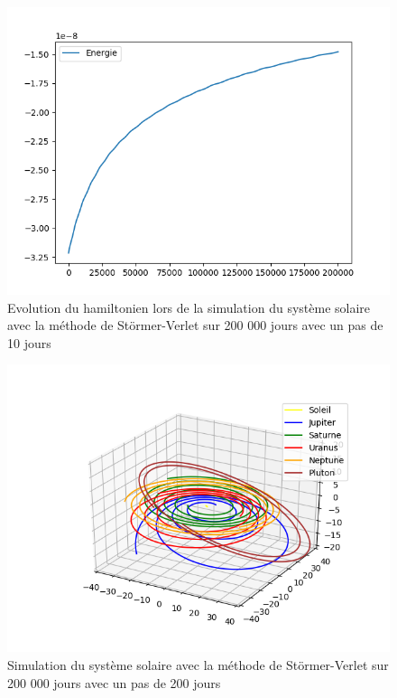 \documentclass{article}
\begin{document}
\begin{figure}[!h]
\begin{center}
\includegraphics[scale=0.7]{Hamiltonien_stormer_verlet.png}
\caption{Evolution du hamiltonien lors de la simulation du système solaire avec la méthode de Störmer-Verlet sur 200 000 jours avec un pas de 10 jours}
\end{center}
\end{figure}
\newpage
\begin{figure}[!h]
\begin{center}
\includegraphics[scale=0.7]{Simulation_stormer_verlet_200.png}
\caption{Simulation du système solaire avec la méthode de Störmer-Verlet sur 200 000 jours avec un pas de 200 jours}
\end{center}
\end{figure}
\end{document}
